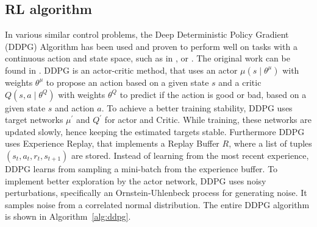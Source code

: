 \documentclass[review]{elsarticle}
\providecommand{\3}{{\ss}}
\begin{document}
  \subsection{\label{RL-algorithm}RL algorithm}
  In various similar control problems, the Deep Deterministic Policy
  Gradient (DDPG) Algorithm has been used and proven to perform well on
  tasks with a continuous action and state space, such as in
  \cite{SafeEfficientAndComfortable}, \cite{ComparisonRLvsMPC} or
  \cite{HumanLikeAutonomouCF}. The original work can be found in
  \cite{DDPG}. DDPG is an actor-critic method, that uses an actor $\mu\left(s \mid \theta^{\mu}\right)$ with weights $\theta^{\mu} $ to propose an action based on a given state $s$ and a critic $Q\left(s, a \mid \theta^{Q}\right) $ with weights  $\theta^{Q}$ to predict if the action is good or bad, based on a given state $s$ and action $a$. To achieve a better training stability, DDPG uses target networks  $\mu^{\prime}$ and $Q^{\prime}$ for actor and Critic. While training, these networks are updated slowly, hence keeping the estimated targets stable. Furthermore DDPG uses Experience Replay, that implements a Replay Buffer $R$, where a list of tuples $\left(s_{t}, a_{t}, r_{t}, s_{t+1}\right)$ are stored. Instead of learning from the most recent experience, DDPG learns from sampling a mini-batch from the experience buffer. To implement better exploration by the actor network, DDPG uses noisy perturbations, specifically an Ornstein-Uhlenbeck process for generating noise. It samples noise from a correlated normal distribution. The entire DDPG algorithm is shown in Algorithm~\ref{alg:ddpg}. 
  
\end{document}
